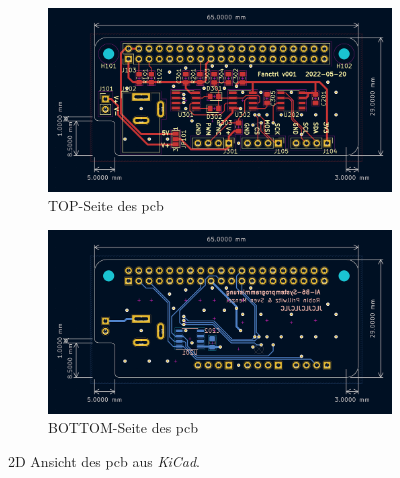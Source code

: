 \begin{figure}[H]
    \centering
    \begin{subfigure}{1.0\textwidth}
        \centering
        \includegraphics[width=15cm]{./pic/pcb-2d-top.png}
        \caption{TOP-Seite des \gls{pcb}}
    \end{subfigure}
    \begin{subfigure}{1.0\textwidth}
        \centering
        \includegraphics[width=15cm]{./pic/pcb-2d-bottom.png}
        \caption{BOTTOM-Seite des \gls{pcb}}
    \end{subfigure}
    \caption{2D Ansicht des \gls{pcb} aus \textit{KiCad}.}
    \label{fig:pcb-2d}
\end{figure}
\newpage

